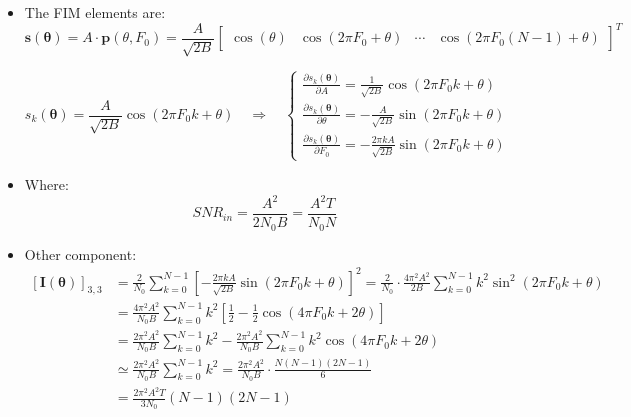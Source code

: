 \begin{itemize}
\[
s_k(\boldsymbol{\theta}) = \frac{A}{\sqrt{2B}} \cos(2\pi F_0 k + \theta)
\quad \Longrightarrow \quad
\begin{cases}
\frac{\partial s_k(\boldsymbol{\theta})}{\partial A} = \frac{1}{\sqrt{2B}} \cos(2\pi F_0 k + \theta) \\[1em]
\frac{\partial s_k(\boldsymbol{\theta})}{\partial \theta} = -\frac{A}{\sqrt{2B}} \sin(2\pi F_0 k + \theta) \\[1em]
\frac{\partial s_k(\boldsymbol{\theta})}{\partial F_0} = -\frac{2\pi k A}{\sqrt{2B}} \sin(2\pi F_0 k + \theta)
\end{cases}
\]
    \item The FIM elements are:
    \[
\mathbf{s}(\boldsymbol{\theta}) = A \cdot \mathbf{p}(\theta, F_0) = \frac{A}{\sqrt{2B}}
\begin{bmatrix}
\cos(\theta) & \cos(2\pi F_0 + \theta) & \cdots & \cos\left(2\pi F_0 (N-1) + \theta\right)
\end{bmatrix}^{T}
\]

\[
s_k(\boldsymbol{\theta}) = \frac{A}{\sqrt{2B}} \cos(2\pi F_0 k + \theta)
\quad \Longrightarrow \quad
\begin{cases}
\frac{\partial s_k(\boldsymbol{\theta})}{\partial A} = \frac{1}{\sqrt{2B}} \cos(2\pi F_0 k + \theta) \\[1em]
\frac{\partial s_k(\boldsymbol{\theta})}{\partial \theta} = -\frac{A}{\sqrt{2B}} \sin(2\pi F_0 k + \theta) \\[1em]
\frac{\partial s_k(\boldsymbol{\theta})}{\partial F_0} = -\frac{2\pi k A}{\sqrt{2B}} \sin(2\pi F_0 k + \theta)
\end{cases}
\]
    \item Where:
    \[
    SNR_{in}=\frac{A^2}{2N_0B}=\frac{A^2T}{N_0N}
    \]
    \item Other component:
\begin{align*}
\left[\mathbf{I}(\boldsymbol{\theta})\right]_{3,3}
&= \frac{2}{N_0} \sum_{k=0}^{N-1}
\left[
    -\frac{2\pi k A}{\sqrt{2B}} \sin(2\pi F_0 k + \theta)
\right]^2
= \frac{2}{N_0} \cdot \frac{4\pi^2 A^2}{2B} \sum_{k=0}^{N-1} k^2 \sin^2(2\pi F_0 k + \theta)\\
&= \frac{4\pi^2 A^2}{N_0 B} \sum_{k=0}^{N-1} k^2 \left[ \frac{1}{2} - \frac{1}{2} \cos(4\pi F_0 k + 2\theta) \right]\\
&= \frac{2\pi^2 A^2}{N_0 B} \sum_{k=0}^{N-1} k^2
- \frac{2\pi^2 A^2}{N_0 B} \sum_{k=0}^{N-1} k^2 \cos(4\pi F_0 k + 2\theta)\\
&\simeq \frac{2\pi^2 A^2}{N_0 B} \sum_{k=0}^{N-1} k^2
= \frac{2\pi^2 A^2}{N_0 B} \cdot \frac{N(N-1)(2N-1)}{6}\\
&= \frac{2\pi^2 A^2 T}{3 N_0} (N-1)(2N-1)
\end{align*}



\end{itemize}
